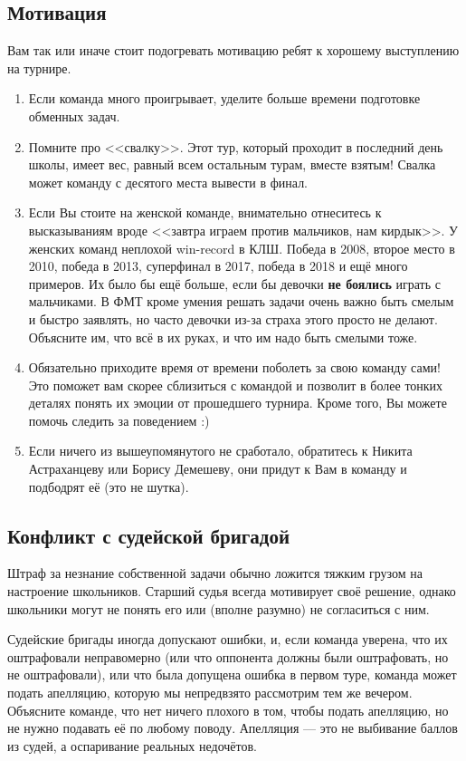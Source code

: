 \documentclass[12pt]{article}
\begin{document}
\subsection*{Мотивация}
Вам так или иначе стоит подогревать мотивацию ребят к хорошему выступлению на турнире. 
\begin{enumerate}
	\item Если команда много проигрывает, уделите больше времени подготовке обменных задач.
	\item Помните про <<свалку>>. Этот тур, который проходит в последний день школы, имеет вес, равный всем остальным турам, вместе взятым! Свалка может команду с десятого места вывести в финал. 
	\item Если Вы стоите на женской команде, внимательно отнеситесь к высказываниям вроде <<завтра играем против мальчиков, нам кирдык>>. У женских команд неплохой win-record в КЛШ. Победа в 2008, второе место в 2010, победа в 2013, суперфинал в 2017, победа в 2018 и ещё много примеров. Их было бы ещё больше, если бы девочки {\bf не боялись} играть с мальчиками. В ФМТ кроме умения решать задачи очень важно быть смелым и быстро заявлять, но часто девочки из-за страха этого просто не делают. Объясните им, что всё в их руках, и что им надо быть смелыми тоже.
	\item Обязательно приходите время от времени поболеть за свою команду сами! Это поможет вам скорее сблизиться с командой и позволит в более тонких деталях понять их эмоции от прошедшего турнира. Кроме того, Вы можете помочь следить за поведением :)
	\item Если ничего из вышеупомянутого не сработало, обратитесь к Никита Астраханцеву или Борису Демешеву, они придут к Вам в команду и подбодрят её (это не шутка).
\end{enumerate}

\subsection*{Конфликт с судейской бригадой}
Штраф за незнание собственной задачи обычно ложится тяжким грузом на настроение школьников. Старший судья всегда мотивирует своё решение, однако школьники могут не понять его или (вполне разумно) не согласиться с ним. 

Судейские бригады иногда допускают ошибки, и, если команда уверена, что их оштрафовали неправомерно (или что оппонента должны были оштрафовать, но не оштрафовали), или что была допущена ошибка в первом туре, команда может подать апелляцию, которую мы непредвзято рассмотрим тем же вечером. Объясните команде, что нет ничего плохого в том, чтобы подать апелляцию, но не нужно подавать её по любому поводу. Апелляция --- это не выбивание баллов из судей, а оспаривание реальных недочётов. 
\end{document}
